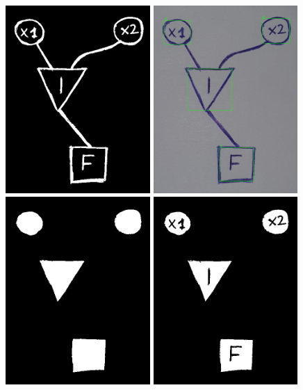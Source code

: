 \documentclass[makeidx, a4paper, 14pt]{extarticle}
\begin{document}
\begin{figure}[H]
    \centering
    \includegraphics[width=55mm]{handwritten_2_binarized_image.png}
    \includegraphics[width=55mm]{handwritten_2_detect_labels.png}
    \includegraphics[width=55mm]{handwritten_2_vertices_pixels.png}
    \includegraphics[width=55mm]{handwritten_2_masked.png}

\end{figure}
\end{document}
